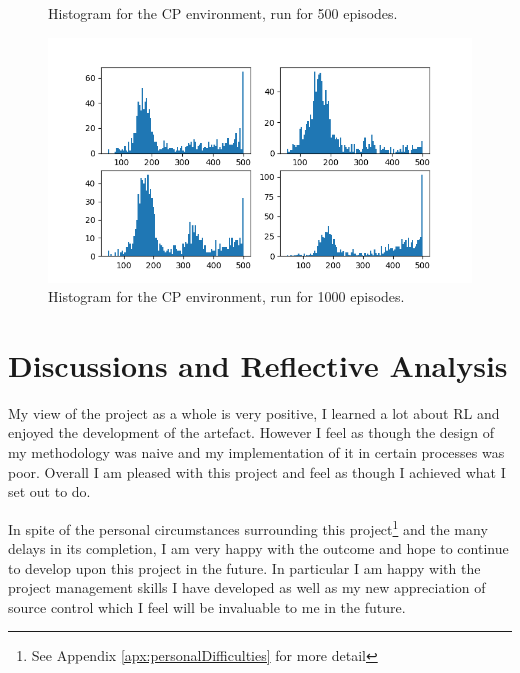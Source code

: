 \documentclass[hidelinks,journal]{IEEEtran}
\begin{document}
\begin{figure}[p]
  \caption{Histogram for the CP environment, run for 500 episodes.}
  \label{fig:cp3ResHist}
  \includegraphics[scale=0.45]{graph/cp4ResHist.png}
  \caption{Histogram for the CP environment, run for 1000 episodes.}
  \label{fig:cp4ResHist}
\end{figure}

\section{Discussions and Reflective Analysis}
\label{sec:discussions}
My view of the project as a whole is very positive, I learned a lot about RL and enjoyed the development of the artefact. However I feel as though the design of my methodology was naive and my implementation of it in certain processes was poor. Overall I am pleased with this project and feel as though I achieved what I set out to do.

In spite of the personal circumstances surrounding this project\footnote{See Appendix \ref{apx:personalDifficulties} for more detail} and the many delays in its completion, I am very happy with the outcome and hope to continue to develop upon this project in the future. In particular I am happy with the project management skills I have developed as well as my new appreciation of source control which I feel will be invaluable to me in the future.
\end{document}
